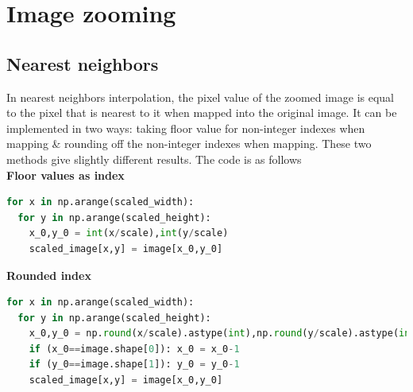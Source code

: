 \documentclass[11pt, a4paper]{article}
\begin{document}
\section{Image zooming}
\subsection{Nearest neighbors}
In nearest neighbors interpolation, the pixel value of the zoomed image is equal to the pixel that is nearest to it when mapped into the original image. It can be implemented in two ways: taking floor value for non-integer indexes when mapping \& rounding off the non-integer indexes when mapping. These two methods give slightly different results. The code is as follows\\
\textbf{Floor values as index}
\begin{lstlisting}[language=python]
for x in np.arange(scaled_width):
  for y in np.arange(scaled_height):
	x_0,y_0 = int(x/scale),int(y/scale)
	scaled_image[x,y] = image[x_0,y_0]
\end{lstlisting}
\textbf{Rounded index}
\begin{lstlisting}[language=python]
for x in np.arange(scaled_width):
  for y in np.arange(scaled_height):
    x_0,y_0 = np.round(x/scale).astype(int),np.round(y/scale).astype(int)
	if (x_0==image.shape[0]): x_0 = x_0-1
    if (y_0==image.shape[1]): y_0 = y_0-1
	scaled_image[x,y] = image[x_0,y_0]
\end{lstlisting}
\end{document}
